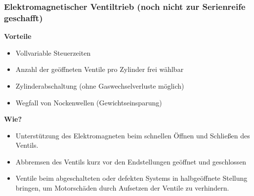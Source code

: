 \subsubsection{Elektromagnetischer Ventiltrieb (noch nicht zur
Serienreife
geschafft)}\label{elektromagnetischer-ventiltrieb-noch-nicht-zur-serienreife-geschafft}

\textbf{Vorteile}

\begin{itemize}
\item
  Vollvariable Steuerzeiten
\item
  Anzahl der geöffneten Ventile pro Zylinder frei wählbar
\item
  Zylinderabschaltung (ohne Gaswechselverluste möglich)
\item
  Wegfall von Nockenwellen (Gewichtseinsparung)
\end{itemize}

\textbf{Wie?}

\begin{itemize}
\item
  Unterstützung des Elektromagneten beim schnellen Öffnen und Schließen
  des Ventils.
\item
  Abbremsen des Ventils kurz vor den Endstellungen geöffnet und
  geschlossen
\item
  Ventile beim abgeschalteten oder defekten Systems in halbgeöffnete
  Stellung bringen, um Motorschäden durch Aufsetzen der Ventile zu
  verhindern.
\end{itemize}
